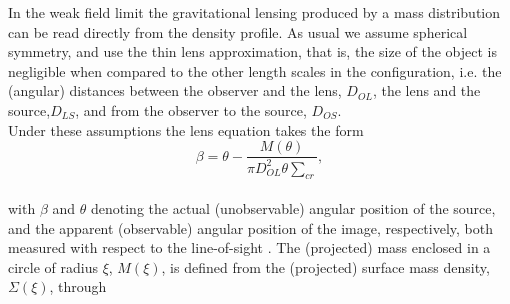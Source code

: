 \documentclass[letterpaper,10pt]{article}
\begin{document}
\begin{multicols}{2}
{In the weak field limit the gravitational lensing produced by a mass distribution can be read directly from the density profile. As usual we assume spherical symmetry, and use the thin lens approximation, that is, the size of the object is negligible when compared to the other length scales in the configuration, i.e. the (angular) distances between the observer and the lens, $D_{OL}$, the lens and the source,$ D_{LS}$, and from the observer to the source, $D_{OS}$.\\
Under these assumptions the lens equation takes the form
\begin{equation}
\label{eq:1}
\beta=\theta-\frac{M(\theta)}{\pi D_{OL}^2\theta\sum_{cr}},
\end{equation}
\\
with $\beta$ and $\theta$ denoting the actual (unobservable) angular position of the source, and the apparent (observable) angular position of the image, respectively, both measured with respect to the line-of-sight \cite{mollerach_roulet_2002}. The (projected)
mass enclosed in a circle of radius $\xi$, $M(\xi)$, is defined from the (projected) surface mass density, $\Sigma(\xi)$, through

}
\end{multicols}
\end{document}
